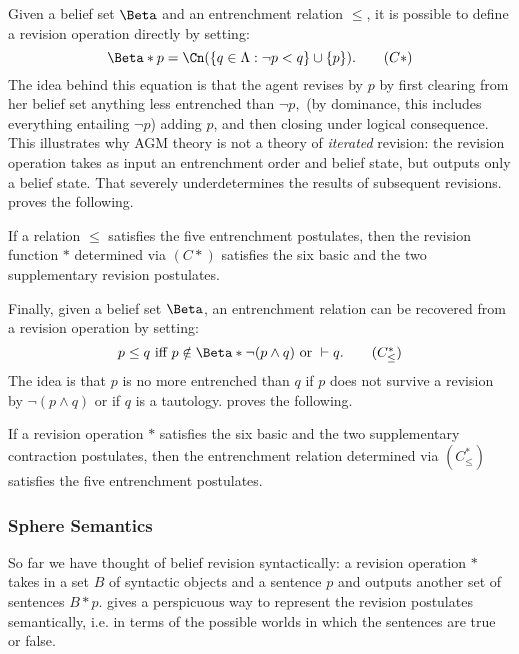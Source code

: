 Given a belief set $\Beta$ and an entrenchment relation $\leq$, it is possible
to define a revision operation directly by setting:
\begin{equation*}
\Beta*p = \Cn( \{ q \in \Lambda : \neg p < q \} \cup \{p\}). \tag{$C*$}
\end{equation*}
The idea behind this equation is that the agent revises by $p$ by first clearing
from her belief set anything less entrenched than $\neg p,$ (by dominance, this
includes everything entailing $\neg p$) adding $p$, and then closing under
logical consequence.  This illustrates why AGM theory is not a theory of {\em
iterated} revision: the revision operation takes as input an entrenchment order
and belief state, but outputs only a belief state. That severely underdetermines
the results of subsequent revisions. \citet{gardenfors1988knowledge} proves the
following.
\begin{theorem}
If a relation $\leq$ satisfies the five entrenchment postulates, then the
revision function $*$ determined via $(C*)$ satisfies the six basic and the two
supplementary revision postulates.
\end{theorem}
Finally, given a belief set $\Beta$, an entrenchment relation can be recovered
from a revision operation by setting:
\begin{equation*}
p\leq q \text{ iff } p\notin \Beta*\neg(p\wedge q) \text{ or } \vdash q. \tag{$C^*_\leq$}
\end{equation*}
The idea is that $p$ is no more entrenched than $q$ if $p$ does not survive a
revision by $\neg(p \wedge q)$ or if $q$ is a tautology.  \citet{rott2003basic}
proves the following.
\begin{theorem}
If a revision operation $*$ satisfies the six basic and the two supplementary
contraction postulates, then the entrenchment relation determined via
$(C^*_\leq)$ satisfies the five entrenchment postulates. 
\end{theorem}


\subsubsection{Sphere Semantics}\label{grove}

So far we have thought of belief revision syntactically: a revision operation
$*$ takes in a set $B$ of syntactic objects and a sentence $p$ and outputs
another set of sentences $B*p.$ \citet{grove1988two} gives a perspicuous way to
represent the revision postulates semantically, i.e. in terms of the possible
worlds in which the sentences are true or false.

